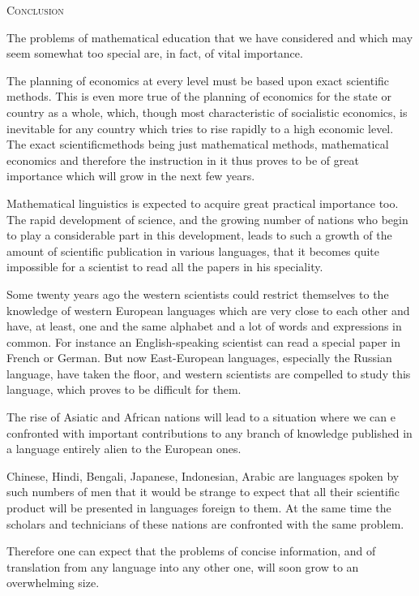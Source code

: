 \begin{center}
\textsc{Conclusion}
\end{center}

The problems of mathematical education that we have considered and
which may seem somewhat too special are, in fact, of vital
importance. 

The planning of economics at every level must be based upon exact
scientific methods. This is even more true of the planning of
economics for the state or country as a whole, which, though most
characteristic of socialistic economics, is inevitable for any country
which tries to rise rapidly to a high economic level. The exact
scientific\pageoriginale methods being just mathematical methods, mathematical
economics and therefore the instruction in it thus proves to be of
great importance which will grow in the next few years.

Mathematical linguistics is expected to acquire great practical
importance too. The rapid development of science, and the growing
number of nations who begin to play a considerable part in this
development, leads to such a growth of the amount of scientific
publication in various languages, that it becomes quite impossible for
a scientist to read all the papers in his speciality.

Some twenty years ago the western scientists could restrict themselves
to the knowledge of western European languages which are very close to
each other and have, at least, one and the same alphabet and a lot of
words and expressions in common. For instance an English-speaking
scientist can read a special paper in French or German. But now
East-European languages, especially the Russian language, have taken
the floor, and western scientists are compelled to study this
language, which proves to be difficult for them. 

The rise of Asiatic and African nations will lead to a situation where
we can e confronted with important contributions to any branch of
knowledge published in a language entirely  alien to the European ones.

Chinese, Hindi, Bengali, Japanese, Indonesian, Arabic are languages
spoken by such numbers of men that it would be strange to expect that
all their scientific product will be presented in languages foreign to
them. At the same time the scholars and technicians of these nations
are confronted with the same problem. 

Therefore one can expect that the problems of concise information, and
of translation from any language into any other one, will soon grow to
an overwhelming size.

